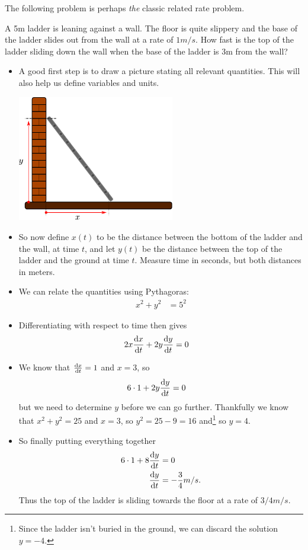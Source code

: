 The following problem is perhaps \emph{the} classic related rate problem.
\begin{eg}
 A 5m ladder is leaning against a wall. The floor is quite slippery and the
base of the ladder slides out from the wall at a rate of $1m/s$. How fast is
the top of the ladder sliding down the wall when the base of the ladder is 3m
from the wall?

\begin{itemize}
 \item A good first step is to draw a picture stating all relevant quantities.
This will also help us define variables and units.
\begin{efig}
\begin{center} \includegraphics[height=5.5cm]{extra/ladder1}
\end{center}

\end{efig}
 \item So now define $x(t)$ to be the distance between the bottom of the ladder and the
wall, at time $t$, and let $y(t)$ be the distance between the top of the ladder and the
ground at time $t$. Measure time in seconds, but both distances in meters.

\item We can relate the quantities using Pythagoras:
\begin{align*}
  x^2 + y^2 &= 5^2
\end{align*}
\item Differentiating with respect to time then gives
\begin{align*}
  2x \diff{x}{t} + 2y \diff{y}{t} &= 0
\end{align*}
\item We know that $\diff{x}{t} = 1$ and $x=3$, so
\begin{align*}
  6 \cdot 1 + 2y \diff{y}{t} &= 0
\end{align*}
but we need to determine $y$ before we can go further. Thankfully we know that
$x^2+y^2=25$ and $x=3$, so $y^2=25-9=16$ and\footnote{Since the ladder
isn't buried in the ground, we can discard the solution $y=-4$.} so $y=4$.
\item So finally putting everything together
\begin{align*}
  6 \cdot 1 + 8 \diff{y}{t} &= 0 \\
  \diff{y}{t} &= - \frac{3}{4} m/s.
\end{align*}
Thus the top of the ladder is sliding towards the floor at a rate of $3/4 m/s$.
\end{itemize}

\end{eg}

